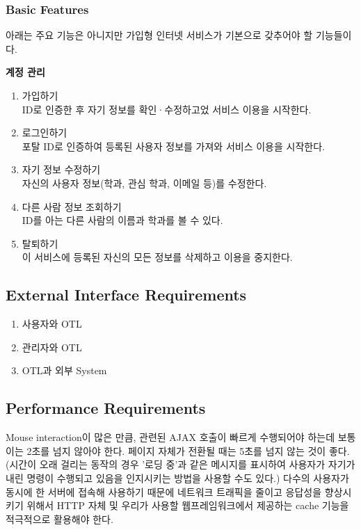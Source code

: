 \documentclass[a4paper,titlepage]{article}
\begin{document}
\subsubsection{Basic Features}
아래는 주요 기능은 아니지만 가입형 인터넷 서비스가 기본으로 갖추어야 할 기능들이다.
\begin{funcreq}
	\setcounter{enumi}{6}
	\item\textbf{계정 관리}
	\begin{enumerate}
		\item 가입하기\\
		ID로 인증한 후 자기 정보를 확인·수정하고었 서비스 이용을 시작한다. 
		\item 로그인하기\\ 
		포탈 ID로 인증하여 등록된 사용자 정보를 가져와 서비스 이용을 시작한다. 
		\item 자기 정보 수정하기\\
		자신의 사용자 정보(학과, 관심 학과, 이메일 등)를 수정한다. 
		\item 다른 사람 정보 조회하기\\
		ID를 아는 다른 사람의 이름과 학과를 볼 수 있다. 
		\item 탈퇴하기\\
		이 서비스에 등록된 자신의 모든 정보를 삭제하고 이용을 중지한다. 
	\end{enumerate}
\end{funcreq}

\subsection{External Interface Requirements}
\begin{enumerate}
	\item 사용자와 OTL
	\item 관리자와 OTL
	\item OTL과 외부 System
\end{enumerate}
\subsection{Performance Requirements}
Mouse interaction이 많은 만큼, 관련된 AJAX 호출이 빠르게 수행되어야 하는데 보통 이는 2초를 넘지 않아야 한다.
페이지 자체가 전환될 때는 5초를 넘지 않는 것이 좋다.
(시간이 오래 걸리는 동작의 경우 '로딩 중'과 같은 메시지를 표시하여 사용자가 자기가 내린 명령이 수행되고 있음을 인지시키는 방법을 사용할 수도 있다.)
다수의 사용자가 동시에 한 서버에 접속해 사용하기 때문에 네트워크 트래픽을 줄이고 응답성을 향상시키기 위해서 HTTP 자체 및 우리가 사용할 웹프레임워크에서 제공하는 cache 기능을 적극적으로 활용해야 한다.
\end{document}

